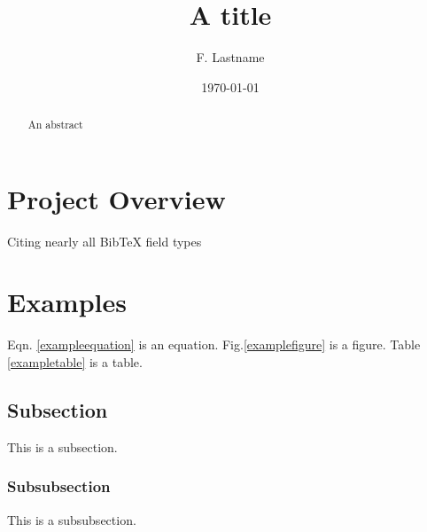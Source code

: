 \documentclass[12pt] {article}
\begin{document}
\title{A title}
\author{F. Lastname}
\date{\today}

\maketitle

\begin{abstract}
An abstract
\end{abstract}

\newpage

\tableofcontents

\listoffigures

\listoftables


\newpage

\section{Project Overview}
Citing nearly all BibTeX field types%


\section{Examples}
Eqn. \ref{exampleequation} is an equation. Fig.\ref{examplefigure} is a figure. Table \ref{exampletable} is a table.

\subsection{Subsection}
This is a subsection.

\subsubsection{Subsubsection}
This is a subsubsection. 
\end{document}
